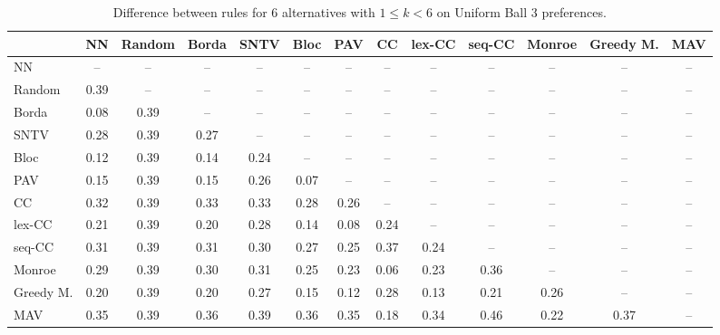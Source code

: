 
\begin{table*}[htbp]
\centering
\begin{tabular}{lcccccccccccc}
\toprule
 & NN & Random & Borda & SNTV & Bloc & PAV & CC & lex-CC & seq-CC & Monroe & Greedy M. & MAV \\
\midrule
NN & -- & -- & -- & -- & -- & -- & -- & -- & -- & -- & -- & -- \\
Random & \cellcolor{blue!39} 0.39 & -- & -- & -- & -- & -- & -- & -- & -- & -- & -- & -- \\
Borda & \cellcolor{blue!8} 0.08 & \cellcolor{blue!39} 0.39 & -- & -- & -- & -- & -- & -- & -- & -- & -- & -- \\
SNTV & \cellcolor{blue!28} 0.28 & \cellcolor{blue!39} 0.39 & \cellcolor{blue!27} 0.27 & -- & -- & -- & -- & -- & -- & -- & -- & -- \\
Bloc & \cellcolor{blue!12} 0.12 & \cellcolor{blue!39} 0.39 & \cellcolor{blue!14} 0.14 & \cellcolor{blue!24} 0.24 & -- & -- & -- & -- & -- & -- & -- & -- \\
PAV & \cellcolor{blue!15} 0.15 & \cellcolor{blue!39} 0.39 & \cellcolor{blue!15} 0.15 & \cellcolor{blue!26} 0.26 & \cellcolor{blue!7} 0.07 & -- & -- & -- & -- & -- & -- & -- \\
CC & \cellcolor{blue!32} 0.32 & \cellcolor{blue!39} 0.39 & \cellcolor{blue!33} 0.33 & \cellcolor{blue!33} 0.33 & \cellcolor{blue!28} 0.28 & \cellcolor{blue!26} 0.26 & -- & -- & -- & -- & -- & -- \\
lex-CC & \cellcolor{blue!21} 0.21 & \cellcolor{blue!39} 0.39 & \cellcolor{blue!20} 0.20 & \cellcolor{blue!28} 0.28 & \cellcolor{blue!14} 0.14 & \cellcolor{blue!8} 0.08 & \cellcolor{blue!24} 0.24 & -- & -- & -- & -- & -- \\
seq-CC & \cellcolor{blue!31} 0.31 & \cellcolor{blue!39} 0.39 & \cellcolor{blue!31} 0.31 & \cellcolor{blue!30} 0.30 & \cellcolor{blue!27} 0.27 & \cellcolor{blue!25} 0.25 & \cellcolor{blue!37} 0.37 & \cellcolor{blue!24} 0.24 & -- & -- & -- & -- \\
Monroe & \cellcolor{blue!28} 0.29 & \cellcolor{blue!39} 0.39 & \cellcolor{blue!30} 0.30 & \cellcolor{blue!31} 0.31 & \cellcolor{blue!25} 0.25 & \cellcolor{blue!23} 0.23 & \cellcolor{blue!6} 0.06 & \cellcolor{blue!23} 0.23 & \cellcolor{blue!36} 0.36 & -- & -- & -- \\
Greedy M. & \cellcolor{blue!20} 0.20 & \cellcolor{blue!39} 0.39 & \cellcolor{blue!20} 0.20 & \cellcolor{blue!27} 0.27 & \cellcolor{blue!15} 0.15 & \cellcolor{blue!12} 0.12 & \cellcolor{blue!28} 0.28 & \cellcolor{blue!13} 0.13 & \cellcolor{blue!21} 0.21 & \cellcolor{blue!26} 0.26 & -- & -- \\
MAV & \cellcolor{blue!35} 0.35 & \cellcolor{blue!39} 0.39 & \cellcolor{blue!36} 0.36 & \cellcolor{blue!39} 0.39 & \cellcolor{blue!36} 0.36 & \cellcolor{blue!35} 0.35 & \cellcolor{blue!18} 0.18 & \cellcolor{blue!34} 0.34 & \cellcolor{blue!46} 0.46 & \cellcolor{blue!22} 0.22 & \cellcolor{blue!37} 0.37 & -- \\
\bottomrule
\end{tabular}

\caption{Difference between rules for 6 alternatives with $1 \leq k < 6$ on Uniform Ball 3 preferences.}
\label{tab:rule_distance_heatmap-m=[6]-pref_dist=euclidean__args__dimensions=3_-_space=uniform_ball}
\end{table*}
    